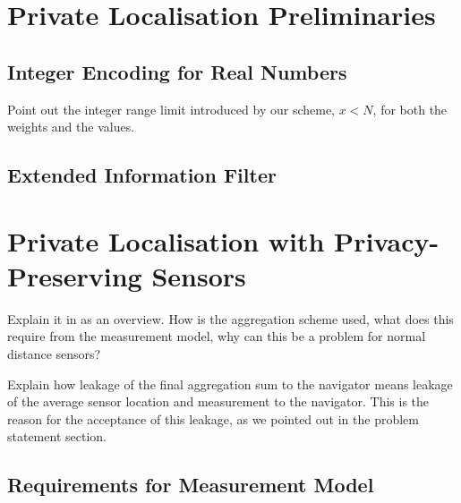 \documentclass[twocolumn]{autart}
\theoremstyle{definition}
\theoremstyle{remark}
\begin{document}
% 
%                                                                                 
%                                                                                 
%                                                                                 
% 

\section{Private Localisation Preliminaries}

\subsection{Integer Encoding for Real Numbers}
Point out the integer range limit introduced by our scheme, $x<N$, for both the weights and the values.

\subsection{Extended Information Filter}


\section{Private Localisation with Privacy-Preserving Sensors} \label{sec:private_localisation}
Explain it in as an overview. How is the aggregation scheme used, what does this require from the measurement model, why can this be a problem for normal distance sensors?

Explain how leakage of the final aggregation sum to the navigator means leakage of the average sensor location and measurement to the navigator. This is the reason for the acceptance of this leakage, as we pointed out in the problem statement section.

\subsection{Requirements for Measurement Model}
\end{document}
